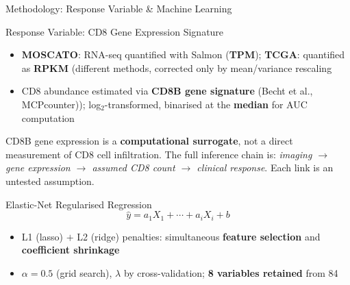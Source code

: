 \documentclass[aspectratio=1610]{beamer}
\begin{document}
\begin{frame}{Methodology: Response Variable \& Machine Learning}
    \begin{block}{Response Variable: CD8 Gene Expression Signature}
        \begin{itemize}
            \footnotesize
            \item \textbf{MOSCATO}: RNA-seq quantified with Salmon (\textbf{TPM}); \textbf{TCGA}: quantified as \textbf{RPKM} (different methods, corrected only by mean/variance rescaling
            \item CD8 abundance estimated via \textbf{CD8B gene signature} (Becht et al., MCPcounter)); log$_2$-transformed, binarised at the \textbf{median} for AUC computation
        \end{itemize}
    \end{block}

    \begin{alertblock}%
        \footnotesize
        CD8B gene expression is a \textbf{computational surrogate}, not a direct measurement of CD8 cell infiltration. The full inference chain is: \textit{imaging $\rightarrow$ gene expression $\rightarrow$ assumed CD8 count $\rightarrow$ clinical response}. Each link is an untested assumption.
    \end{alertblock}

    \begin{block}{Elastic-Net Regularised Regression}
        $$\hat{y} = a_1 X_1 + \cdots + a_i X_i + b$$
        \vspace{-0.5cm}
        \begin{itemize}
            \footnotesize
            \item L1 (lasso) $+$ L2 (ridge) penalties: simultaneous \textbf{feature selection} and \textbf{coefficient shrinkage}
            \item $\alpha = 0.5$ (grid search), $\lambda$ by cross-validation; \textbf{8 variables retained} from 84
        \end{itemize}
    \end{block}
\end{frame}
\end{document}
